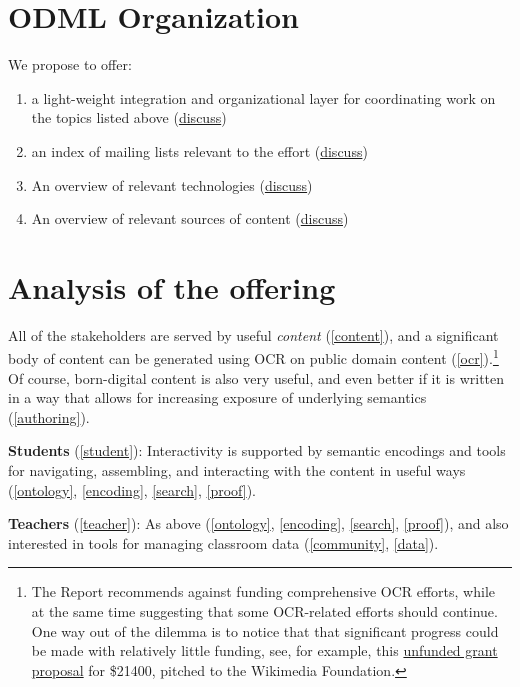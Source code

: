\documentclass{article}
\begin{document}
\section{ODML Organization}

We propose to offer:

\begin{enumerate}
\item\label{integration} a light-weight integration and organizational layer for coordinating work on the topics listed above (\href{https://github.com/holtzermann17/skelodml/wiki/1.-Home}{discuss})
\item\label{mail} an index of mailing lists relevant to the effort (\href{https://github.com/holtzermann17/skelodml/wiki/2.-Mailing-lists}{discuss})
\item\label{technology} An overview of relevant technologies (\href{https://github.com/holtzermann17/skelodml/wiki/3.-Technology-overview}{discuss})
\item\label{content} An overview of relevant sources of content (\href{https://github.com/holtzermann17/skelodml/wiki/4.-Content-overview}{discuss})
\end{enumerate}

\section{Analysis of the offering}

All of the stakeholders are served by useful \emph{content} (\ref{content}), and a significant body of content can be generated using OCR on public domain content (\ref{ocr}).\footnote{The Report recommends against funding comprehensive OCR efforts, while at the same time suggesting that some OCR-related efforts should continue.  One way out of the dilemma is to notice that that significant progress could be made with relatively little funding, see, for example, this \href{http://meta.wikimedia.org/wiki/Grants:IEG/PlanetMath_Books_Project}{unfunded grant proposal} for \$21400, pitched to the Wikimedia Foundation.}  Of course, born-digital content is also very useful, and even better if it is written in a way that allows for increasing exposure of underlying semantics (\ref{authoring}).

\textbf{Students} (\ref{student}): Interactivity is supported by semantic encodings and tools for navigating, assembling, and interacting with the content in useful ways (\ref{ontology}, \ref{encoding}, \ref{search}, \ref{proof}).

\textbf{Teachers} (\ref{teacher}): As above (\ref{ontology}, \ref{encoding}, \ref{search}, \ref{proof}), and also interested in tools for managing classroom data (\ref{community}, \ref{data}).
\end{document}
